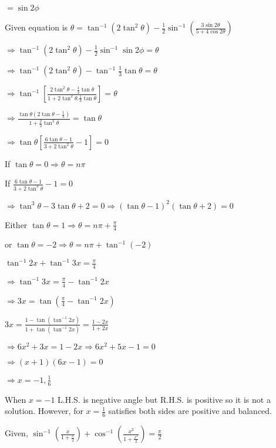   $= \sin2\phi$

  Given equation is $\theta = \tan^{-1}(2\tan^2\theta) - \frac{1}{2}\sin^{-1}\left(\frac{3\sin2\theta}{5 +
    4\cos2\theta}\right)$

  $\Rightarrow \tan^{-1}(2\tan^2\theta) - \frac{1}{2}\sin^{-1}\sin2\phi = \theta$

  $\Rightarrow \tan^{-1}(2\tan^2\theta) - \tan^{-1}\frac{1}{3}\tan\theta = \theta$

  $\Rightarrow \tan^{-1}\left[\frac{2\tan^2\theta - \frac{1}{3}\tan\theta}{1 +
      2\tan^2\theta.\frac{1}{3}\tan\theta}\right] = \theta$

  $\Rightarrow \frac{\tan\theta\left(2\tan\theta - \frac{1}{3}\right)}{1 + \frac{2}{3}\tan^3\theta} = \tan\theta$

  $\Rightarrow \tan\theta\left[\frac{6\tan\theta - 1}{3 + 2\tan^2\theta} - 1\right] = 0$

  If $\tan\theta = 0 \Rightarrow \theta = n\pi$

  If $\frac{6\tan\theta - 1}{3 + 2\tan^3\theta} - 1 = 0$

  $\Rightarrow \tan^3\theta - 3\tan\theta + 2 = 0 \Rightarrow (\tan\theta - 1)^2(\tan\theta + 2) = 0$

  Either $\tan\theta = 1 \Rightarrow \theta = n\pi + \frac{\pi}{4}$

  or $\tan\theta = -2 \Rightarrow \theta = n\pi + \tan^{-1}(-2)$

\item $\tan^{-1}2x + \tan^{-1}3x = \frac{\pi}{4}$

  $\Rightarrow \tan^{-1}3x = \frac{\pi}{4} - \tan^{-1}2x$

  $\Rightarrow 3x = \tan\left(\frac{\pi}{4} - \tan^{-1}2x\right)$

  $3x = \frac{1 - \tan(\tan^{-1}2x)}{1 + \tan(\tan^{-1}2x)} = \frac{1 - 2x}{1 + 2x}$

  $\Rightarrow 6x^2 + 3x = 1 - 2x \Rightarrow 6x^2 + 5x - 1 = 0$

  $\Rightarrow (x + 1)(6x - 1) = 0$

  $\Rightarrow x = -1, \frac{1}{6}$

  When $x = -1$ L.H.S. is negative angle but R.H.S. is positive so it is not a solution. However, for $x =
  \frac{1}{6}$ satisfies both sides are positive and balanced.

\item Given, $\sin^{-1}\left(\frac{x}{1 + \frac{x}{2}}\right) + \cos^{-1}\left(\frac{x^2}{1 + \frac{x^2}{2}}\right) =
  \frac{\pi}{2}$

